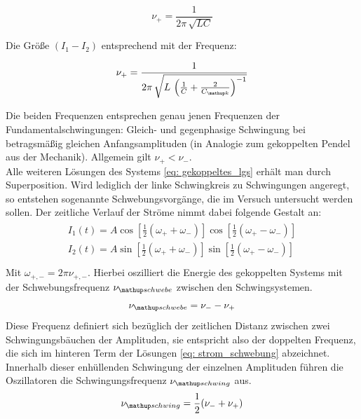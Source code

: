 \begin{equation}
  \nu_+ = \frac{1}{2\pi \, \sqrt{LC}}
  \label{eq: nu+}
\end{equation}

Die Größe $\left( I_1 - I_2 \right)$ entsprechend mit der Frequenz:

\begin{equation}
\nu_+ = \frac{1}{2\pi \, \sqrt{L\, \left(\frac{1}{C} + \frac{2}{C\ua{k}}\right)^{-1}}}
\label{eq: nu-}
\end{equation}

Die beiden Frequenzen entsprechen genau jenen Frequenzen der Fundamentalschwingungen: Gleich- und gegenphasige Schwingung bei
betragsmäßig gleichen Anfangsamplituden (in Analogie zum gekoppelten Pendel aus der Mechanik). Allgemein gilt $\nu_+ < \nu_-$.\\
Alle weiteren Lösungen des Systems \eqref{eq: gekoppeltes_lgs} erhält man durch Superposition. Wird lediglich der linke Schwingkreis zu Schwingungen
angeregt, so entstehen sogenannte Schwebungsvorgänge, die im Versuch untersucht werden sollen. Der zeitliche Verlauf der Ströme nimmt dabei folgende
Gestalt an:
  \begin{align}
  \begin{aligned}
    I_1(t) = A \cos\left[\frac{1}{2}(\omega_+ + \omega_-) \right]\cos\left[\frac{1}{2}(\omega_+ - \omega_-) \right] \\
    I_2(t) = A \sin\left[\frac{1}{2}(\omega_+ + \omega_-) \right]\sin\left[\frac{1}{2}(\omega_+ - \omega_-) \right] \\
    \label{eq: strom_schwebung}
  \end{aligned}
  \end{align}
Mit $\omega_{+,-} = 2\pi \nu_{+,-}$. Hierbei oszilliert die Energie des gekoppelten Systems
mit der Schwebungsfrequenz $\nu\ua{schwebe}$ zwischen den Schwingsystemen.
\begin{equation}
  \nu\ua{schwebe} = \nu_- - \nu_+
  \label{eq: nu_schwebe}
\end{equation}
Diese Frequenz definiert sich bezüglich der zeitlichen Distanz zwischen zwei Schwingungsbäuchen der Amplituden, sie entspricht also
der doppelten Frequenz, die sich im hinteren Term der Lösungen \eqref{eq: strom_schwebung} abzeichnet.
Innerhalb dieser enhüllenden Schwingung der einzelnen Amplituden führen die Oszillatoren die Schwingungsfrequenz $\nu\ua{schwing}$ aus.
\begin{equation}
  \nu\ua{schwing} =  \frac{1}{2}(\nu_- + \nu_+)
  \label{eq: nu_schwing}
\end{equation}\par

